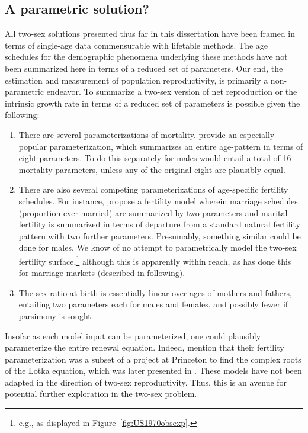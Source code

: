 \subsection{A parametric solution?} 
All two-sex solutions presented thus far in
this dissertation have been framed in terms of single-age data commensurable with lifetable
methods. The age schedules for the demographic phenomena underlying these
methods have not been summarized here in terms of a reduced set of parameters.
Our end, the estimation and measurement of population reproductivity, is primarily 
a non-parametric endeavor. To summarize a two-sex version of net reproduction or
the intrinsic growth rate in terms of a reduced set of parameters is
possible given the following: 
\begin{enumerate}
  \item There are several parameterizations of mortality.
  \citet{heligman1980age} provide an especially popular parameterization, which 
  summarizes an entire age-pattern in terms of eight parameters. To do this
  separately for males would entail a total of 16 mortality parameters, unless
  any of the original eight are plausibly equal.
  \item There are also several competing parameterizations of age-specific
  fertility schedules. For instance, \citet{coale1974model} propose a fertility
  model wherein marriage schedules (proportion ever married) are summarized by
  two parameters and marital fertility is summarized in terms of departure from
  a standard natural fertility pattern with two further parameters. Presumably,
  something similar could be done for males. We know of no attempt to
  parametrically model the two-sex fertility surface,\footnote{e.g., as
  displayed in Figure~\ref{fig:US1970obsexp}.} although this is apparently
  within reach, as \citet{marriage1981warren,
sanderson1983two} has done this for marriage markets (described in following).
  \item The sex ratio at birth is essentially linear over ages of mothers and
  fathers, entailing two parameters each for males and females, and possibly
  fewer if parsimony is sought.
\end{enumerate}

Insofar as each model input can be parameterized, one could plausibly
parameterize the entire renewal equation. Indeed, \citet{coale1974model} mention
that their fertility parameterization was a subset of a project at
Princeton to find the complex roots of the Lotka equation, which
was later presented in \citet{james1977determinants}. These models have not 
been adapted in the direction of two-sex reproductivity. Thus, this is an avenue
for potential further exploration in the two-sex problem.

